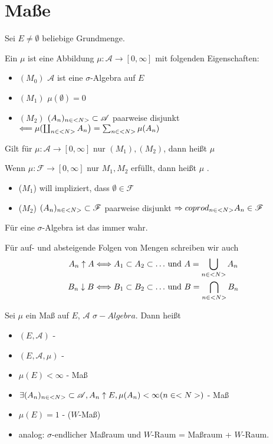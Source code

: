 \section{Maße}

Sei $E \neq \emptyset$ beliebige Grundmenge.

\begin{definition}[Maß]
	Ein  $\mu$ ist eine Abbildung $\mu: \mathscr{A} \to [0,\infty]$ mit folgenden Eigenschaften:
	\begin{itemize}
		\item $(M_0)$ $\mathscr{A}$ ist eine $\sigma$-Algebra auf $E$
		\item $(M_1)$ $\mu(\emptyset) = 0$
		\item $(M_2)$ $(A_n)_{n \in <N>} \subset \mathscr{A}$ paarweise disjunkt $\Longleftarrow \mu(\coprod_{n\in <N>} A_n\big) = \sum_{n\in <N>} \mu(A_n)$
	\end{itemize}
	Gilt für $\mu: \mathscr{A} \to [0,\infty]$ nur $(M_1),(M_2)$, dann heißt $\mu$ 
\end{definition}

\begin{remark}
	Wenn $\mu: \mathscr{F} \to [0,\infty]$ nur $M_1, M_2$ erfüllt, dann heißt $\mu$ .
	\begin{itemize}
		\item ($M_1$) will impliziert, dass $\emptyset \in \mathscr{F}$
		\item ($M_2$) $(A_n)_{n \in <N>} \subset \mathscr{F}$ paarweise disjunkt $\Rightarrow coprod_{n \in <N>} A_n \in \mathscr{F}$
	\end{itemize}
	Für eine $\sigma$-Algebra ist das immer wahr.
\end{remark}

Für auf- und absteigende Folgen von Mengen schreiben wir auch
\begin{align}
	A_n \uparrow A \Longleftrightarrow A_1 \subset A_2 \subset \dots &\text{ und } A = \bigcup_{n\in <N>} A_n \notag \\
	B_n \downarrow B \Longleftrightarrow B_1 \subset B_2 \subset \dots &\text{ und } B = \bigcap_{n\in <N>} B_n \notag
\end{align}

\begin{definition}
	Sei $\mu$ ein Maß auf $E$, $\mathscr{A}$ $\sigma-Algebra$. Dann heißt
	\begin{itemize}
		\item $(E,\mathscr{A})$ - 
		\item $(E,\mathscr{A},\mu)$ - 
		\item $\mu(E) < \infty$ -  Maß
		\item $\exists (A_n)_{n \in <N>} \subset \mathscr{A}, A_n \uparrow E, \mu(A_n) < \infty (n \in <N>)$ -  Maß
		\item $\mu(E) = 1$ -  ($W$-Maß)
		\item analog: $\sigma$-endlicher Maßraum und $W$-Raum = Maßraum + $W$-Raum.
	\end{itemize}
\end{definition}

